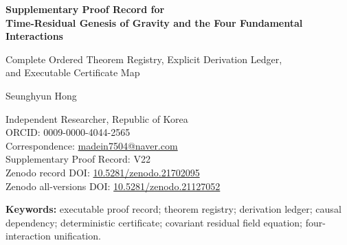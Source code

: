 \documentclass[11pt]{article}
\numberwithin{equation}{section}
\theoremstyle{remark}
\newcommand{\doi}[1]{\href{https://doi.org/#1}{#1}}
\begin{document}
\begin{center}
\vspace*{0.45cm}
{\Large\bfseries Supplementary Proof Record for\\[1mm]
Time-Residual Genesis of Gravity and the Four Fundamental Interactions\par}
\vspace{0.30cm}
{\large Complete Ordered Theorem Registry, Explicit Derivation Ledger,\\
and Executable Certificate Map\par}
\vspace{0.70cm}
{\large Seunghyun Hong\par}
Independent Researcher, Republic of Korea\\
ORCID: 0009-0000-4044-2565\\
Correspondence: \href{mailto:madein7504@naver.com}{madein7504@naver.com}\\
Supplementary Proof Record: V22\\
Zenodo record DOI: \doi{10.5281/zenodo.21702095}\\
Zenodo all-versions DOI: \doi{10.5281/zenodo.21127052}\\
\vspace{0.55cm}
\end{center}

\begin{abstract}
This supplementary record provides the exhaustive executable proof index for the accompanying Main Manuscript. It contains the complete causal registry of $525$ theorem roots and the complete ledger of $544$ explicit derivations generated by the standalone source. The registry is not a substitute for the mathematical exposition in the Main Manuscript. Its purpose is to make every formal claim traceable to one callable proof root, one deterministic output marker, one causal stage, and one declared generated domain. The derivation ledger records, row by row, the generated input, exact operation, generated output, and mathematical consequence used by later stages. The artifact-coherence matrix, source and output hashes, symbol glossary, and data-availability statement complete the reproducibility layer. Internal theorem closure remains distinct from empirical identification, historical priority, unrestricted physical equivalence, and third-party reproduction.
\end{abstract}

\noindent\textbf{Keywords:} executable proof record; theorem registry; derivation ledger; causal dependency; deterministic certificate; covariant residual field equation; four-interaction unification.
\end{document}
